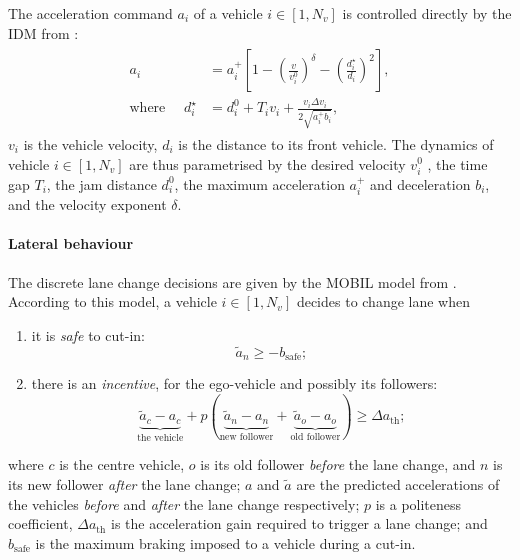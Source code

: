 The acceleration command $a_i$ of a vehicle $i\in[1, N_v]$ is controlled directly by the \gls{IDM} from \citep{Treiber2000}:
\begin{align}
\begin{split}
a_i &= a_i^+\left[1-\left(\frac{v}{v_i^0}\right)^\delta - \left(\frac{d^{\star}_i}{d_i}\right)^2\right], \\
\text{where }\quad d^{\star}_i &= d_i^0 + T_i v_i + \frac{v_i\Delta v_i}{2\sqrt{a_i^+ b_i}},
\end{split}
\end{align}
$v_i$ is the vehicle velocity, $d_i$ is the distance to its front vehicle.
The dynamics of vehicle $i\in[1, N_v]$ are thus parametrised by the desired velocity $v_i^0$ , the time gap $T_i$, the jam distance $d_i^0$, the maximum acceleration $a_i^+$ and deceleration $b_i$, and the velocity exponent $\delta$.

\paragraph{Lateral behaviour}

The discrete lane change decisions are given by the \gls{MOBIL} model from \citep{Kesting2007}.
According to this model, a vehicle $i\in[1, N_v]$ decides to change lane when

\begin{enumerate}[label=(\roman*)]
	\item it is \emph{safe} to cut-in:
		\begin{equation*}
			\tilde{a}_n \geq - b_\text{safe};
		\end{equation*}
	\item there is an \emph{incentive}, for the ego-vehicle and possibly its followers:
		\begin{equation*}
		\underbrace{\tilde{a}_c - a_c}_{\text{the vehicle}} + p\left(\underbrace{\tilde{a}_n - a_n}_{\text{new follower}} + \underbrace{\tilde{a}_o - a_o}_{\text{old follower}}\right) \geq \Delta a_\text{th};
		\end{equation*}
\end{enumerate}
where $c$ is the centre vehicle, $o$ is its old follower \emph{before} the lane change, and $n$ is its new follower \emph{after} the lane change; $a$ and $\tilde{a}$ are the predicted accelerations of the vehicles \emph{before} and \emph{after} the lane change respectively; $p$ is a politeness coefficient, $\Delta a_\text{th}$ is the acceleration gain required to trigger a lane change; and $b_\text{safe}$ is the maximum braking imposed to a vehicle during a cut-in.

